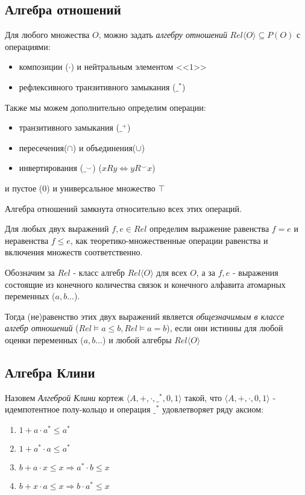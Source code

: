 \documentclass[times
              ]{itmo-student-thesis}
\begin{document}
    \subsection{Алгебра отношений}
      Для любого множества $ O $, можно задать \textit{алгебру отношений} $\mathit{Rel}\langle O \rangle \subseteq P(O) $ с операциями:
      \begin{itemize}
        \item композиции ($ \cdot $) и нейтральным элементом <<$1$>>
        \item рефлексивного транзитивного замыкания ($ \_^* $)
      \end{itemize}

      Также мы можем дополнительно определим операции:
      \begin{itemize}
        \item транзитивного замыкания ($ \_^{+} $)
        \item пересечения($ \cap $) и объединения($ \cup $)
        \item инвертирования ($ \_^\smile $) ($ x R y \Leftrightarrow y R^\smile x $)
      \end{itemize}
      и пустое ($0$) и универсальное множество $ \top $

      Алгебра отношений замкнута относительно всех этих операций.

      Для любых двух выражений $ f, e \in \mathit{Rel}$ определим выражение равенства $ f = e $ и неравенства $ f \leq e $, как теоретико-множественные операции равенства и включения множеств соответственно.

      Обозначим за $\mathit{Rel}$ - класс алгебр $ \mathit{Rel}\langle O \rangle $ для всех $ O $,
      а за $ f, e $ - выражения состоящие из конечного количества связок и конечного алфавита атомарных переменных ($ a, b \dots $).

      Тогда (не)равенство этих двух выражений является \textit{общезначимым в классе алгебр отношений}
      ($\mathit{Rel} \models a \leq b, \mathit{Rel} \models a = b $), если они истинны для любой оценки переменных ($a, b \dots $) и любой алгебры $ \mathit{Rel}\langle O \rangle $

    \subsection{Алгебра Клини}

      Назовем \textit{Алгеброй Клини} кортеж $\langle A,+,\cdot,\_^*,0,1\rangle$ такой, что $\langle A, +, \cdot, 0, 1 \rangle$ - идемпотентное полу-кольцо и операция $ \_^* $ удовлетворяет ряду аксиом:
      \begin{enumerate}
        \item $ 1 + a \cdot a^* \leq a^* $
        \item $ 1 + a^* \cdot a \leq a^* $
        \item $ b + a \cdot x \leq x \Rightarrow a^* \cdot b \leq x $
        \item $ b + x \cdot a \leq x \Rightarrow b \cdot a^* \leq x $
      \end{enumerate}
\end{document}
